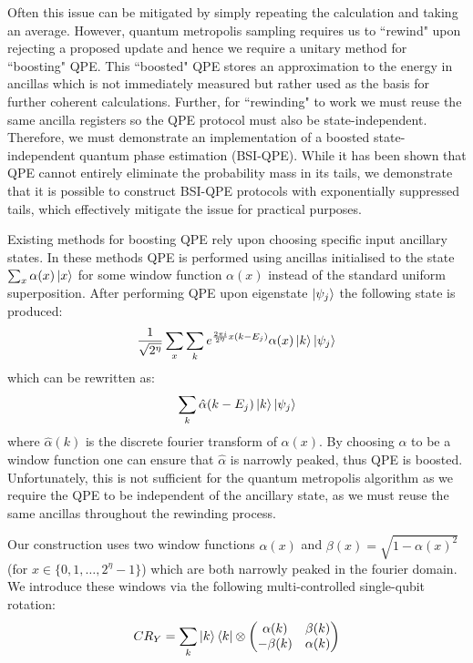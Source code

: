 \documentclass[aps,floatfix,10pt,amssymb,amsfont,amsmath,superscriptaddress,float,nofootinbib,longbibliography,nobalancelastpage,twocolumn]{revtex4-2}
\begin{document}
Often this issue can be mitigated by simply repeating the calculation and taking an average. However, quantum metropolis sampling requires us to ``rewind" upon rejecting a proposed update and hence we require a unitary method for ``boosting" QPE. This ``boosted" QPE stores an approximation to the energy in ancillas which is not immediately measured but rather used as the basis for further coherent calculations. Further, for ``rewinding" to work we must reuse the same ancilla registers so the QPE protocol must also be state-independent. Therefore, we must demonstrate an implementation of a boosted state-independent quantum phase estimation (BSI-QPE). While it has been shown \cite{chen2023quantumthermalstatepreparation} that QPE cannot entirely eliminate the probability mass in its tails, we demonstrate that it is possible to construct BSI-QPE protocols with exponentially suppressed tails, which effectively mitigate the issue for practical purposes. 

Existing methods for boosting QPE rely upon choosing specific input ancillary states. In these methods QPE is performed using ancillas initialised to the state $\sum_x \alpha(x) \ket{x}$ for some window function $\alpha(x)$ instead of the standard uniform superposition. After performing QPE upon eigenstate $\ket{\psi_j}$ the following state is produced:
\begin{equation}
   \frac{1}{\sqrt{2^{\eta}}} \sum_x \sum_k e^{\frac{2 \pi i}{2^{\eta}}x(k-E_j)} \alpha(x)\ket{k}\ket{\psi_j}
\end{equation}
which can be rewritten as:
\begin{equation}
    \sum_k \hat\alpha(k-E_j) \ket{k}\ket{\psi_j}
\end{equation}
where $\hat \alpha(k)$ is the discrete fourier transform of $\alpha(x)$. By choosing $\alpha$ to be a window function one can ensure that $\hat \alpha$ is narrowly peaked, thus QPE is boosted. Unfortunately, this is not sufficient for the quantum metropolis algorithm as we require the QPE to be independent of the ancillary state, as we must reuse the same ancillas throughout the rewinding process. 

Our construction uses two window functions $\alpha(x)$ and $\beta(x) = \sqrt{1-\alpha(x)^2}$ (for $x\in\{0,1,\ldots,2^{\eta}-1\}$) which are both narrowly peaked in the fourier domain. We introduce these windows via the following multi-controlled single-qubit rotation:
\begin{equation}
   CR_Y = \sum_k \ket{k}\bra{k}\otimes \begin{pmatrix}
        \alpha(k)& \beta(k)\\
        -\beta(k)& \alpha(k)
    \end{pmatrix}
\end{equation}
\end{document}
